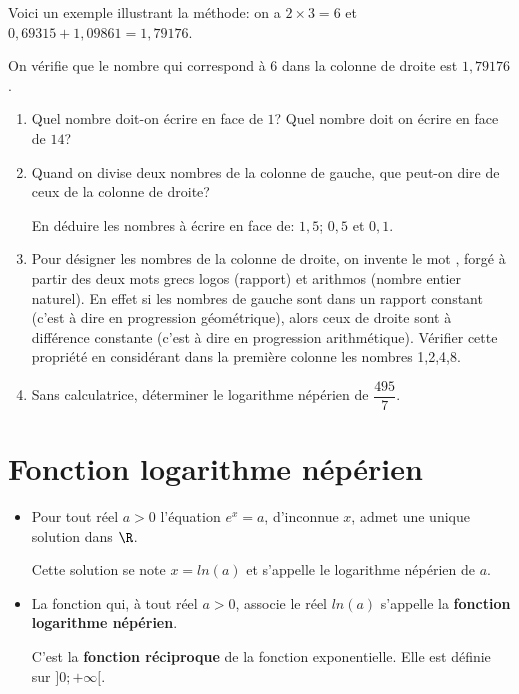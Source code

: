 \documentclass[a4paper]{article}
\begin{document}
\begin{activite}{}{}
 Voici un exemple illustrant la méthode: on a $2\times 3 = 6$ et $0,69315+1,09861=1,79176$.

 On vérifie que le nombre qui correspond à $6$ dans la colonne de droite est $1,79176$.

 \begin{enumerate}
  \item Quel nombre doit-on écrire en face de $1$? Quel nombre doit on écrire en face de $14$?
  \vspace{1cm}
  \item Quand on divise deux nombres de la colonne de gauche, que peut-on dire de ceux de la colonne de droite?
  \vspace{1cm}

  En déduire les nombres à écrire en face de: $1,5$; $0,5$ et $0,1$.

  \item Pour désigner les nombres de la colonne de droite, on invente le mot , forgé à partir des deux
  mots grecs logos (rapport) et arithmos (nombre entier naturel). En effet si les nombres de gauche sont dans
  un rapport constant (c'est à dire en progression géométrique), alors ceux de droite sont à différence constante
  (c'est à dire en progression arithmétique). Vérifier cette propriété en considérant dans la première colonne les
  nombres 1,2,4,8.
  \vspace{2cm}

  \item Sans calculatrice, déterminer le logarithme népérien de $\dfrac{495}{7}$.
  \vspace{2.5cm}
 \end{enumerate}
\end{activite}



\pagebreak

\section{Fonction logarithme népérien}

\begin{definition}{}{}
\begin{itemize}[label=\textbullet]
  \item Pour tout réel $a>0$ l'équation $e^x=a$, d'inconnue $x$, admet une unique solution dans $\R$.

  Cette solution se note $x=ln(a)$ et s'appelle le logarithme népérien de $a$.

  \item La fonction qui, à tout réel $a>0$, associe le réel $ln(a)$ s'appelle la \textbf{fonction logarithme népérien}.

  C'est la \textbf{fonction réciproque} de la fonction exponentielle. Elle est définie sur $]0;+\infty[$.
\end{itemize}
\end{definition}
\end{document}
